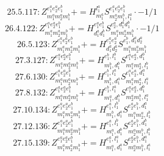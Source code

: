 \documentclass[letterpaper,10pt,fleqn,leqno,onecolumn]{article}
\begin{document}
\begin{equation} \;\;\;\;\;\;  25.5.117: Z^{e_{1}^{a}e_{2}^{a}e_{1}^{b}}_{m_{1}^{a}m_{2}^{a}m_{1}^{b}}+=H^{l_{1}^{a}}_{m_{1}^{a}}S^{e_{1}^{a}e_{2}^{a}e_{1}^{b}}_{m_{2}^{a}m_{1}^{b},l_{1}^{a}}\cdot -1/1 \end{equation}
\begin{equation} \;\;\;\;\;\;  26.4.122: Z^{e_{1}^{a}e_{2}^{a}e_{1}^{b}}_{m_{1}^{a}m_{2}^{a}m_{1}^{b}}+=H^{e_{1}^{a}e_{1}^{b}}_{d_{1}^{a}d_{1}^{b}}S^{e_{2}^{a},d_{1}^{a}d_{1}^{b}}_{m_{1}^{a}m_{2}^{a}m_{1}^{b}}\cdot -1/1 \end{equation}
\begin{equation} \;\;\;\;\;\;  26.5.123: Z^{e_{1}^{a}e_{2}^{a}e_{1}^{b}}_{m_{1}^{a}m_{2}^{a}m_{1}^{b}}+=H^{e_{1}^{a}e_{2}^{a}}_{d_{1}^{a}d_{2}^{a}}S^{e_{1}^{b},d_{1}^{a}d_{2}^{a}}_{m_{1}^{a}m_{2}^{a}m_{1}^{b}} \end{equation}
\begin{equation} \;\;\;\;\;\;  27.3.127: Z^{e_{1}^{a}e_{2}^{a}e_{1}^{b}}_{m_{1}^{a}m_{2}^{a}m_{1}^{b}}+=H^{e_{1}^{b},l_{1}^{b}}_{m_{1}^{b},d_{1}^{b}}S^{e_{1}^{a}e_{2}^{a},d_{1}^{b}}_{m_{1}^{a}m_{2}^{a},l_{1}^{b}} \end{equation}
\begin{equation} \;\;\;\;\;\;  27.6.130: Z^{e_{1}^{a}e_{2}^{a}e_{1}^{b}}_{m_{1}^{a}m_{2}^{a}m_{1}^{b}}+=H^{e_{1}^{b},l_{1}^{a}}_{m_{1}^{b},d_{1}^{a}}S^{e_{1}^{a}e_{2}^{a},d_{1}^{a}}_{m_{1}^{a}m_{2}^{a},l_{1}^{a}} \end{equation}
\begin{equation} \;\;\;\;\;\;  27.8.132: Z^{e_{1}^{a}e_{2}^{a}e_{1}^{b}}_{m_{1}^{a}m_{2}^{a}m_{1}^{b}}+=H^{e_{1}^{b},l_{1}^{a}}_{m_{1}^{a},d_{1}^{b}}S^{e_{1}^{a}e_{2}^{a},d_{1}^{b}}_{m_{2}^{a}m_{1}^{b},l_{1}^{a}} \end{equation}
\begin{equation} \;\;\;\;\;\;  27.10.134: Z^{e_{1}^{a}e_{2}^{a}e_{1}^{b}}_{m_{1}^{a}m_{2}^{a}m_{1}^{b}}+=H^{e_{1}^{a},l_{1}^{b}}_{m_{1}^{b},d_{1}^{a}}S^{e_{2}^{a}e_{1}^{b},d_{1}^{a}}_{m_{1}^{a}m_{2}^{a},l_{1}^{b}} \end{equation}
\begin{equation} \;\;\;\;\;\;  27.12.136: Z^{e_{1}^{a}e_{2}^{a}e_{1}^{b}}_{m_{1}^{a}m_{2}^{a}m_{1}^{b}}+=H^{e_{1}^{a},l_{1}^{b}}_{m_{1}^{a},d_{1}^{b}}S^{e_{2}^{a}e_{1}^{b},d_{1}^{b}}_{m_{2}^{a}m_{1}^{b},l_{1}^{b}} \end{equation}
\begin{equation} \;\;\;\;\;\;  27.15.139: Z^{e_{1}^{a}e_{2}^{a}e_{1}^{b}}_{m_{1}^{a}m_{2}^{a}m_{1}^{b}}+=H^{e_{1}^{a},l_{1}^{a}}_{m_{1}^{a},d_{1}^{a}}S^{e_{2}^{a}e_{1}^{b},d_{1}^{a}}_{m_{2}^{a}m_{1}^{b},l_{1}^{a}} \end{equation}
\end{document}
